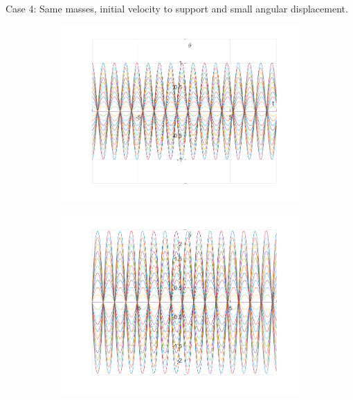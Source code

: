 \documentclass{article}
\begin{document}
	
	Case 4:
	Same masses, initial velocity to support and small angular displacement.
	\begin{figure}[h!]
		\centering
		\begin{subfigure}[b]{0.48\linewidth}
			\includegraphics[width=\linewidth]{./SmallOscillations/S4/F1.png}
		\end{subfigure}
		\begin{subfigure}[b]{0.48\linewidth}
			\includegraphics[width=\linewidth]{./SmallOscillations/S4/F2.png}
		\end{subfigure}
	\end{figure}
	
\end{document}
